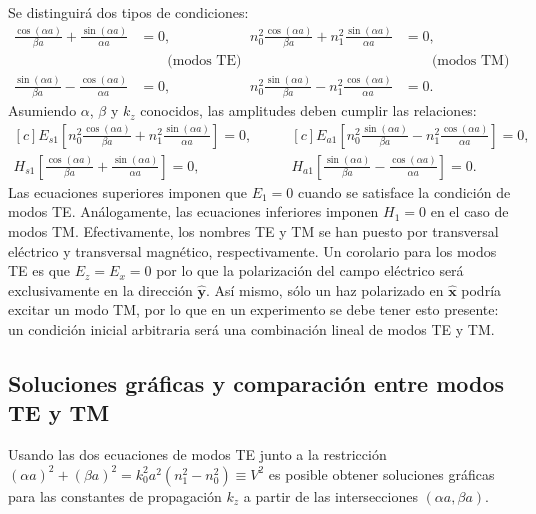Se distinguirá dos tipos de condiciones:
\begin{align*}
	\frac{\cos(\alpha a)}{\beta a} + \frac{\sin(\alpha a)}{\alpha a}&= 0, & n_0^2 \frac{\cos(\alpha a)}{\beta a} + n_1^2\frac{\sin(\alpha a)}{\alpha a}  &= 0,
	\\
	&\qquad\text{(modos TE)}	& &\qquad\text{(modos TM)}	
	\\
	 \frac{\sin(\alpha a)}{\beta a} - \frac{\cos(\alpha a)}{\alpha a} &= 0, &  n_0^2\frac{\sin(\alpha a)}{\beta a} - n_1^2\frac{\cos(\alpha a)}{\alpha a} &= 0.
\end{align*}
Asumiendo $\alpha$, $\beta$ y $k_z$ conocidos, las amplitudes deben cumplir las relaciones:
\begin{equation*}
	\begin{aligned}[c]
	E_{s1} \left[n_0^2 \frac{\cos(\alpha a)}{\beta a}+n_1 ^2 \frac{\sin(\alpha a)}{\alpha a}\right] = 0,
		\\
	H_{s1} \left[\frac{\cos(\alpha a)}{\beta a} + \frac{\sin(\alpha a)}{\alpha a} \right] = 0,
\end{aligned} 
\quad\quad
	\begin{aligned}[c]
	E_{a1} \left[ n_0^2\frac{\sin(\alpha a)}{\beta a} - n_1^2\frac{\cos(\alpha a)}{\alpha a}\right] = 0,
		\\
	H_{a1} \left[ \frac{\sin(\alpha a)}{\beta a} - \frac{\cos(\alpha a)}{\alpha a}\right] = 0.
\end{aligned} 
\end{equation*}
Las ecuaciones superiores imponen que $E_1 = 0$ cuando se satisface la condición de modos TE. Análogamente, las ecuaciones inferiores imponen $H_1 = 0$ en el caso de modos TM. Efectivamente, los nombres TE y TM se han puesto por transversal eléctrico y transversal magnético, respectivamente.
Un corolario para los modos TE es que $E_z = E_x = 0$ por lo que la polarización del campo eléctrico será exclusivamente en la dirección $\hat{\textbf{y}}$. Así mismo, sólo un haz polarizado en $\hat{\textbf{x}}$ podría excitar un modo TM, por lo que en un experimento se debe tener esto presente: un condición inicial arbitraria será una combinación lineal de modos TE y TM.

\subsection{Soluciones gráficas y comparación entre modos TE y TM}

Usando las dos ecuaciones de modos TE junto a la restricción $(\alpha a)^2 + (\beta a)^2 = k_0^2 a^2(n_1^2 - n_0^2) \equiv V^2$ es posible obtener soluciones gráficas para las constantes de propagación $k_z$ a partir de las intersecciones $(\alpha a, \beta a)$. 

